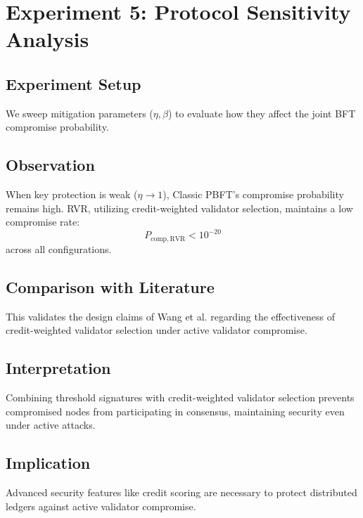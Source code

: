 \documentclass[12pt, oneside, a4paper]{report}
\theoremstyle{definition}
\theoremstyle{remark}
\begin{document}
\section{Experiment 5: Protocol Sensitivity Analysis}
\label{sec:res:e5}

\subsection{Experiment Setup}
We sweep mitigation parameters ($\eta, \beta$) to evaluate how they affect the joint BFT compromise probability.

\subsection{Observation}
When key protection is weak ($\eta \to 1$), Classic PBFT's compromise probability remains high. RVR, utilizing credit-weighted validator selection, maintains a low compromise rate:
\begin{equation}
P_{\mathrm{comp,RVR}} < 10^{-20}
\end{equation}
across all configurations.

\subsection{Comparison with Literature}
This validates the design claims of Wang et al. \cite{wang2025} regarding the effectiveness of credit-weighted validator selection under active validator compromise.

\subsection{Interpretation}
Combining threshold signatures with credit-weighted validator selection prevents compromised nodes from participating in consensus, maintaining security even under active attacks.

\subsection{Implication}
Advanced security features like credit scoring are necessary to protect distributed ledgers against active validator compromise.

\bigskip
\end{document}
